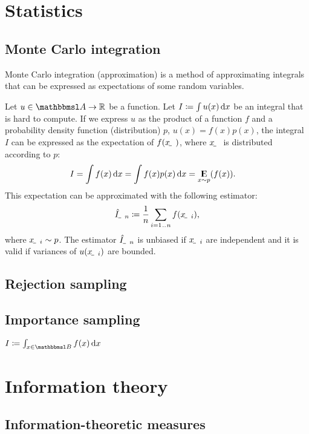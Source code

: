 \documentclass{article}
\begin{document}
\section{Statistics}

\subsection{Monte Carlo integration}

Monte Carlo integration (approximation) is a method of approximating integrals that can be expressed as expectations of some random variables.

Let $u\in \set A\to \R$ be a function. Let $I\coloneqq\int u(x)\operatorname{d \!} x$ be an integral that is hard to compute. If we express $u$ as the product of a function $f$ and a probability density function (distribution) $p$, $u(x) = f(x)p(x)$, the integral $I$ can be expressed as the expectation of $f(\rvar x)$, where $\rvar x$ is distributed according to $p$:
\begin{align}
    I &= \int f(x)\operatorname{d \!} x = \int f(x)p(x)\operatorname{d \!} x = \operatorname*{\mathrm{I\kern-.282em E}}_{x\sim p}(f(x)) \text .
\end{align}
This expectation can be approximated with the following estimator:
\begin{align} 
    \rvar{\hat I}_n \coloneqq \frac{1}{n}\sum_{i=1\bidot n} f(\rvar x_i) \text{,}
\end{align}
where $\rvar x_i\sim p$. The estimator $\rvar{\hat I}_n$ is unbiased if $\rvar x_i$ are independent and it is valid if variances of $u(\rvar x_i)$ are bounded.

\subsection{Rejection sampling}

\subsection{Importance sampling}
$I\coloneqq\int_{x\in \set B}f(x)\dif x$

\section{Information theory}


\subsection{Information-theoretic measures}
\end{document}

